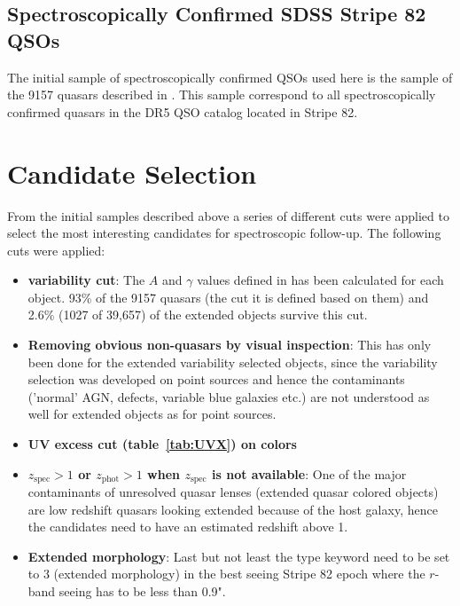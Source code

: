 \documentclass[a4paper,11pt]{article}
\begin{document}
\subsection{Spectroscopically Confirmed SDSS Stripe 82 QSOs}

The initial sample of spectroscopically confirmed QSOs used here is the sample
of the 9157 quasars described in \cite{schmidt10}. This sample correspond to
all spectroscopically confirmed quasars in the DR5 QSO catalog
\citep{schneider07} located in Stripe 82.


\section{Candidate Selection}\label{sec:cansel}

From the initial samples described above a series of different cuts were
applied to select the most interesting candidates for spectroscopic follow-up.
The following cuts were applied:

\begin{itemize}

\item \textbf{\cite{schmidt10} variability cut}: The $A$ and $\gamma$ values
defined in \cite{schmidt10} has been calculated for each object. 93\% of the
9157 quasars (the cut it is defined based on them) and 2.6\% (1027 of 39,657)
of the extended objects survive this cut.

\item \textbf{Removing obvious non-quasars by visual inspection}: This has
only been done for the extended variability selected objects, since the
variability selection was developed on point sources and hence the
contaminants ('normal' AGN, defects, variable blue galaxies etc.) are not
understood as well for extended objects as for point sources.

\item \textbf{UV excess cut (table~\ref{tab:UVX}) on colors}

\item \textbf{$z_\textrm{spec}>1$ or $z_\textrm{phot}>1$ when
$z_\textrm{spec}$ is not available}: One of the major contaminants of
unresolved quasar lenses (extended quasar colored objects) are low redshift
quasars looking extended because of the host galaxy, hence the candidates need
to have an estimated redshift above 1.

\item \textbf{Extended morphology}: Last but not least the type keyword need
to be set to 3 (extended morphology) in the best seeing Stripe 82 epoch where
the $r$-band seeing has to be less than 0.9".


\end{itemize}
\end{document}
